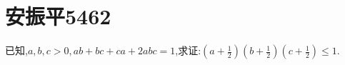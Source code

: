 \documentclass[]{article}
\title{}
\author{}
\date{}
\begin{document}
\section{安振平5462}{
已知,$a,b,c>0,ab+bc+ca+2abc =1$,求证:$\displaystyle (a+\frac{1}{2})(b+\frac{1}{2})(c+\frac{1}{2})\leq 1$.

}
\end{document}

